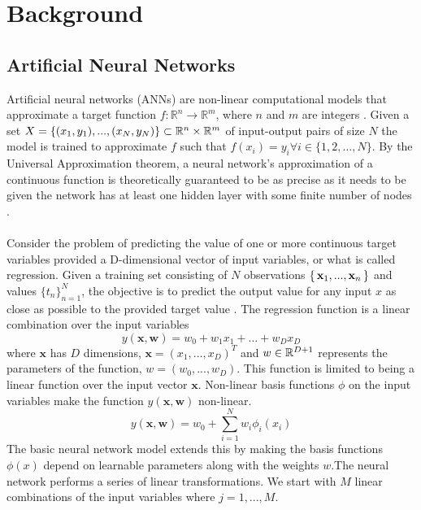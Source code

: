 \chapter{Background}
\label{ch1}

\minitoc 

\section{Artificial Neural Networks}
Artificial neural networks (ANNs) are non-linear computational models that approximate a target function   $f: \mathbb{R}^n \rightarrow \mathbb{R}^m$, where $n$ and $m$ are integers \cite{Bis:06}. Given a set $X = \{ (x_1, y_1), ..., (x_N, y_N) \} \subset \mathbb R^n \times \mathbb R^m$ of input-output pairs of size $N$ the model is trained to approximate $f$ such that $f(x_i) = y_i \forall i \in \{1, 2, \ldots, N\}$. By the Universal Approximation theorem, a neural network's approximation of a continuous function is theoretically guaranteed to be as precise as it needs to be given the network has at least one hidden layer with some finite number of nodes \cite{HorStiWhi:89}. \\\\
Consider the problem of predicting the value of one or more continuous target variables  provided a D-dimensional vector  of input variables, or what is called regression. Given a training set consisting of $N$ observations $\set{ \mathbf{x}_1, ..., \mathbf{x}_n }$ and values $\{t_n\}_{n=1}^N$, the objective is to predict the output value for any input $x$ as close as possible to the provided target value . The regression function is a linear combination over the input variables 
\begin{equation} 
    y(\mathbf{x},\mathbf{w}) = w_0 + w_1x_1 + ... + w_Dx_D
\end{equation}
where $\mathbf{x}$ has $D$ dimensions, $\mathbf{x} = (x_1, ..., x_D)^T$ and $w \in \mathbb R^{D+1}$ represents the parameters of the function, $w = (w_0, ..., w_D)$. This function is limited to being a linear function over the input vector $\mathbf{x}$. Non-linear basis functions $\phi$ on the input variables make the function $y\left(\mathbf{x}, \mathbf{w}\right)$ non-linear.
\begin{equation} 
    y(\mathbf{x},\mathbf{w}) = w_0 + \sum_{i=1}^{N} w_i \phi_i\left(x_i\right)
\end{equation}
The basic neural network model extends this by making the basis functions $\phi\left(x\right)$ depend on learnable parameters along with the weights $w$.The neural network performs a series of linear transformations. We start with $M$ linear combinations of the input variables where $j = 1, ..., M$.
